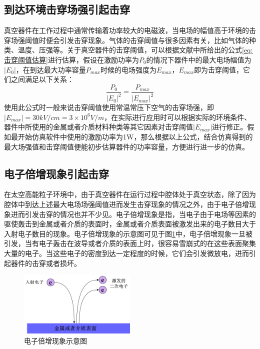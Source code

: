 \documentclass[master]{thesis-uestc}
\begin{document}
\subsection{到达环境击穿场强引起击穿}
真空器件在工作过程中通常传输着功率较大的电磁波，当电场的幅值高于环境的击穿场强阈值时便会引发击穿现象。气体的击穿阈值与很多因素有关，比如气体的种类、温度、压强等。关于真空器件的击穿阈值，可以根据文献\cite{chaiyuanyuan_window_2016}中所给出的公式\ref{eq:击穿阈值估算}进行估算，假设在激励功率为\(P_0\)的情况下器件中的最大电场幅值为\(\left| E_0 \right|\)，在到达最大功率容量\(P_{max}\)时候的电场强度为\(E_{max}\)，\(E_{max}\)即为击穿阈值，它们之间满足以下关系：
\begin{equation}\label{eq:击穿阈值估算}
    \frac{P_0}{\left|E_0\right|^2}=\frac{P_{max}}{\left|E_{max}\right|^2}
\end{equation}
使用此公式时一般来说击穿阈值使用常温常压下空气的击穿场强，即\(\left|E_{max}\right| = 30kV/cm = 3 \times 10^6V/m\)，在实际进行应用时可以根据实际的环境条件、器件中所使用的金属或者介质材料种类等其它因素对击穿阈值\(\left|E_{max}\right|\)进行修正。假如最开始仿真软件中使用的激励功率为1W，那么根据以上公式，结合仿真得到的最大场强值和击穿阈值便能初步估算器件的功率容量，方便进行进一步的仿真。

\subsection{电子倍增现象引起击穿}\label{subsec:电子倍增现象理论}
在太空高能粒子环境中，由于真空器件在运行过程中腔体处于真空状态，除了因为腔体中到达上述最大电场场强阈值进而发生击穿现象的情况之外，由于电子倍增现象进而引发击穿的情况也并不少见。电子倍增现象是指，当电子由于电场等因素的驱使轰击到金属或者介质的表面时，金属或者介质表面被激发出来的电子数目大于入射电子数目的现象。电子倍增现象的示意图可见于图\ref{fig:二次电子发射示意图}中，电子倍增现象一旦被引发，当有电子轰击在波导或者介质的表面上时，很容易雪崩式的在这些表面聚集大量的电子。当这些电子的密度到达一定程度的时候，它们会引发微放电，进而引起器件的击穿或者损坏。
\begin{figure}[!htb]
    \centering
    \includegraphics[width=0.5\textwidth]{pic/chapter2/二次电子发射示意图.png}
    \caption{电子倍增现象示意图}
    \label{fig:二次电子发射示意图}
\end{figure}
\end{document}
